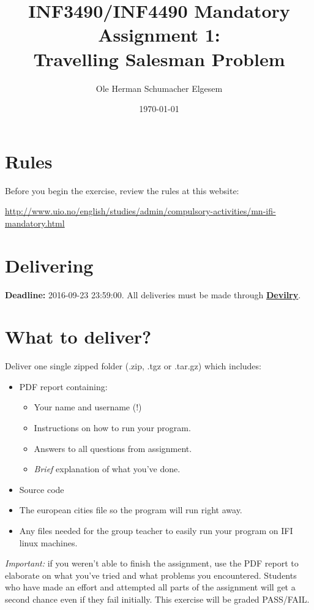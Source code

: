 \documentclass{article}           %
\title{\vspace{-2cm}INF3490/INF4490 Mandatory Assignment 1:\\
Travelling Salesman Problem}
\author{Ole Herman Schumacher Elgesem}
\date{\today}
\newcommand\marginsymbol[1][0pt]{%
  \tabto*{0cm}\makebox[\dimexpr-1cm-#1\relax][r]{$\mathbb{P}$}\tabto*{\TabPrevPos}}
\begin{document}
    \renewcommand\marginsymbol[1][0pt]{%
  \tabto*{0cm}\makebox[-1cm][c]{$\mathbb{P}$}\tabto*{\TabPrevPos}}

\maketitle
\section*{Rules}
Before you begin the exercise, review the rules at this website:
\begin{center}
\url{http://www.uio.no/english/studies/admin/compulsory-activities/mn-ifi-mandatory.html}
\end{center}
\section*{Delivering}
\textbf{Deadline:} 2016-09-23 23:59:00. All deliveries must be made through
\href{https://devilry.ifi.uio.no}{\textbf{Devilry}}.
\section*{What to deliver?}
Deliver one single zipped folder (.zip, .tgz or .tar.gz) which includes:
\begin{itemize}
    \item PDF report containing:
    \begin{itemize}
        \item Your name and username (!)
        \item Instructions on how to run your program.
        \item Answers to all questions from assignment.
        \item \emph{Brief} explanation of what you've done.
    \end{itemize}
    \item Source code
    \item The european cities file so the program will run right away.
    \item Any files needed for the group teacher to easily run your program on
          IFI linux machines.
\end{itemize}
\emph{Important: } if you weren't able to finish the assignment, use the PDF
report to elaborate on what you've tried and what problems you encountered.
Students who have made an effort and attempted all parts of the assignment
will get a second chance even if they fail initially. This exercise will be
graded PASS/FAIL.
\end{document}
